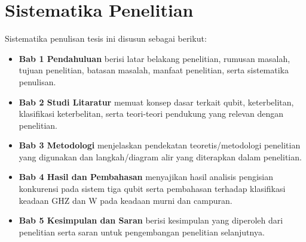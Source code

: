 \section{Sistematika Penelitian}
Sistematika penulisan tesis ini disusun sebagai berikut:
\begin{itemize}
    \item \textbf{Bab 1 Pendahuluan} berisi latar belakang penelitian, rumusan masalah, tujuan penelitian, batasan masalah, manfaat penelitian, serta sistematika penulisan.
    \item \textbf{Bab 2 Studi Litaratur} memuat konsep dasar terkait qubit, keterbelitan, klasifikasi keterbelitan, serta teori-teori pendukung yang relevan dengan penelitian.
    \item \textbf{Bab 3 Metodologi} menjelaskan pendekatan teoretis/metodologi penelitian yang digunakan dan langkah/diagram alir yang diterapkan dalam penelitian.
    \item \textbf{Bab 4 Hasil dan Pembahasan} menyajikan hasil analisis pengisian konkurensi pada sistem tiga qubit serta pembahasan terhadap klasifikasi keadaan GHZ dan W pada keadaan murni dan campuran.
    \item \textbf{Bab 5 Kesimpulan dan Saran} berisi kesimpulan yang diperoleh dari penelitian serta saran untuk pengembangan penelitian selanjutnya.
\end{itemize}


